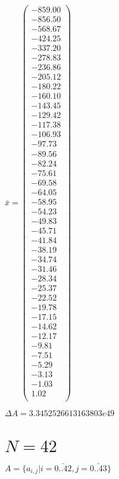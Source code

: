 \documentclass[a4paper,12pt]{article}
\begin{document}
$\bar { x } = \begin{pmatrix}
-859.00 \\
-856.50 \\
-568.67 \\
-424.25 \\
-337.20 \\
-278.83 \\
-236.86 \\
-205.12 \\
-180.22 \\
-160.10 \\
-143.45 \\
-129.42 \\
-117.38 \\
-106.93 \\
-97.73 \\
-89.56 \\
-82.24 \\
-75.61 \\
-69.58 \\
-64.05 \\
-58.95 \\
-54.23 \\
-49.83 \\
-45.71 \\
-41.84 \\
-38.19 \\
-34.74 \\
-31.46 \\
-28.34 \\
-25.37 \\
-22.52 \\
-19.78 \\
-17.15 \\
-14.62 \\
-12.17 \\
-9.81 \\
-7.51 \\
-5.29 \\
-3.13 \\
-1.03 \\
1.02 \\
\end{pmatrix}
$

$\Delta A = 3.3452526613163803e49$



\section{ $N = 42$ }
$A = \{ a _{ i, j } | i = \bar { 0..42 }, j = \bar { 0..43 } \}$
\end{document}
